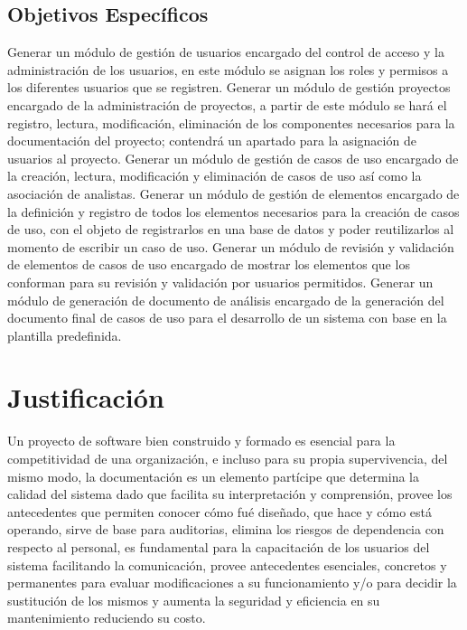 \subsection{Objetivos Específicos}
Generar un módulo de gestión de usuarios encargado del control de acceso y la administración de los usuarios, en este módulo se asignan los roles y permisos a los diferentes usuarios que se registren.
Generar un módulo de gestión proyectos encargado de la administración de proyectos, a partir de este módulo se hará el registro, lectura, modificación, eliminación de los componentes necesarios para la documentación del proyecto; contendrá un apartado para la asignación de usuarios al proyecto.
Generar un módulo de gestión de casos de uso encargado de la creación, lectura, modificación y eliminación de casos de uso así como la asociación de analistas.
Generar un módulo de gestión de elementos encargado de la definición y registro de todos los elementos necesarios para la creación de casos de uso, con el objeto de registrarlos en una base de datos y poder reutilizarlos al momento de escribir un caso de uso.
Generar un módulo de revisión y validación de elementos de casos de uso encargado de mostrar los elementos que los conforman para su revisión y validación por usuarios permitidos.
Generar un módulo de generación de documento de análisis encargado de la generación del documento final de casos de uso para el desarrollo de un sistema con base en la plantilla predefinida.


\section{Justificación}
Un proyecto de software bien construido y formado es esencial para la competitividad de una organización, e incluso para su propia supervivencia, del mismo modo, la documentación es un elemento partícipe que determina la calidad del sistema dado que facilita su interpretación y comprensión, provee los antecedentes que permiten conocer cómo fué diseñado, que hace y cómo está operando, sirve de base para auditorias, elimina los riesgos de dependencia con respecto al personal, es fundamental para la capacitación de los usuarios del sistema facilitando la comunicación, provee antecedentes esenciales, concretos y permanentes para evaluar modificaciones a su funcionamiento y/o para decidir la sustitución de los mismos y aumenta la seguridad y eficiencia en su mantenimiento reduciendo su costo.

